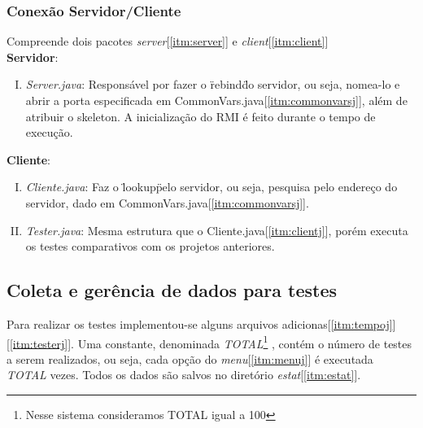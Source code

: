 \documentclass[a4paper,10pt]{article}
\begin{document}
\subsubsection{Conexão Servidor/Cliente}
Compreende dois pacotes \emph{server}[\ref{itm:server}] e \emph{client}[\ref{itm:client}]
\\\textbf{Servidor}:
\begin{enumerate}[I.]
\item \label{itm:serverj} \emph{Server.java}: Responsável por fazer o \"rebind\" do servidor, ou seja, nomea-lo e abrir a porta especificada em CommonVars.java[\ref{itm:commonvarsj}], além de atribuir o 
skeleton. A inicialização do RMI é feito durante o tempo de execução.
\end{enumerate}
\textbf{Cliente}:
\begin{enumerate}[I.]
\item \label{itm:clientj} \emph{Cliente.java}: Faz o \"lookup\" pelo servidor, ou seja, pesquisa pelo endereço do servidor, dado em CommonVars.java[\ref{itm:commonvarsj}].
\item \label{itm:testerj} \emph{Tester.java}: Mesma estrutura que o Cliente.java[\ref{itm:clientj}], porém executa os testes comparativos com os projetos anteriores.
\end{enumerate}
\subsection{Coleta e gerência de dados para testes}
Para realizar os testes implementou-se alguns arquivos adicionas[\ref{itm:tempoj}] [\ref{itm:testerj}]. Uma constante, denominada \emph{TOTAL}\footnote{Nesse sistema consideramos TOTAL igual a 100} , contém o número de testes a serem realizados, ou seja, cada opção do \emph{menu}[\ref{itm:menuj}] é executada \emph{TOTAL} vezes. Todos os dados são 
salvos no diretório \emph{estat}[\ref{itm:estat}].
\end{document}
